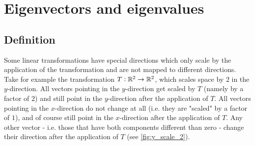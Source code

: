 \section{Eigenvectors and eigenvalues}
\subsection{Definition}
Some linear transformations have special directions which only scale by the application of the transformation and are not mapped to different directions. Take for example the transformation $T:\mathbb{R}^{2}\to\mathbb{R}^{2}$, which scales space by $2$ in the $y$-direction. All vectors pointing in the $y$-direction get scaled by $T$ (namely by a factor of $2$) and still point in the $y$-direction after the application of $T$. All vectors pointing in the $x$-direction do not change at all (i.e. they are "scaled" by a factor of $1$), and of course still point in the $x$-direction after the application of $T$. Any other vector - i.e. those that have both components different than zero - change their direction after the application of $T$ (see \autoref{fig:y_scale_2}).

